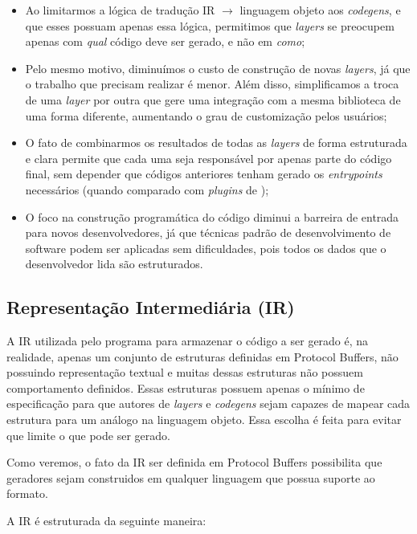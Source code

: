 \begin{itemize}
\item Ao limitarmos a lógica de tradução IR $\rightarrow$ linguagem objeto aos \textit{codegens},
  e que esses possuam apenas essa lógica, permitimos que \textit{layers} se preocupem apenas com
  \textit{qual} código deve ser gerado, e não em \textit{como};
\item Pelo mesmo motivo, diminuímos o custo de construção de novas \textit{layers}, já que o
  trabalho que precisam realizar é menor. Além disso, simplificamos a troca de uma \textit{layer}
  por outra que gere uma integração com a mesma biblioteca de uma forma diferente, aumentando o
  grau de customização pelos usuários;
\item O fato de combinarmos os resultados de todas as \textit{layers} de forma estruturada e clara
  permite que cada uma seja responsável por apenas parte do código final, sem depender que códigos
  anteriores tenham gerado os \textit{entrypoints} necessários (quando comparado com
  \textit{plugins} de \cite{googl:protobuf});
\item O foco na construção programática do código diminui a barreira de entrada para novos
  desenvolvedores, já que técnicas padrão de desenvolvimento de software podem ser aplicadas sem
  dificuldades, pois todos os dados que o desenvolvedor lida são estruturados.
\end{itemize}

\subsection{Representação Intermediária (IR)}

A IR utilizada pelo programa para armazenar o código a ser gerado é, na realidade, apenas um
conjunto de estruturas definidas em Protocol Buffers, não possuindo representação textual e
muitas dessas estruturas não possuem comportamento definidos. Essas estruturas possuem apenas
o mínimo de especificação para que autores de \textit{layers} e \textit{codegens} sejam capazes
de mapear cada estrutura para um análogo na linguagem objeto. Essa escolha é feita para evitar
que \Baker{} limite o que pode ser gerado.

Como veremos, o fato da IR ser definida em Protocol Buffers possibilita que geradores sejam
construidos em qualquer linguagem que possua suporte ao formato.

A IR é estruturada da seguinte maneira:

